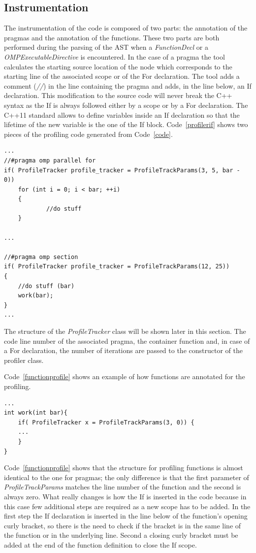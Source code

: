 \documentclass[a4paper,12pt,oneside]{book}
\begin{document}
\subsection{Instrumentation}
The instrumentation of the code is composed of two parts: the annotation of the pragmas and the annotation of the functions. These two parts are both performed during the parsing of the AST when a \emph{FunctionDecl} or a \emph{OMPExecutableDirective} is encountered. In the case of a pragma the tool calculates the starting source location of the node which corresponds to the starting line of the associated scope or of the For declaration. The tool adds a comment (\emph{//}) in the line containing the pragma and adds, in the line below,  an If declaration.  This modification to the source code will never break the C++ syntax as the If is always followed either by a scope or by a For declaration. The C++11 standard allows to define variables inside an If declaration so that the lifetime of the new variable is the one of the If block. Code~\ref{profilerif} shows two pieces of the profiling code generated from Code~\ref{code}.

\begin{lstlisting}[language=CCC, caption=Parts of the profiling code generated from Code~\ref{code}., label=profilerif]
...
//#pragma omp parallel for
if( ProfileTracker profile_tracker = ProfileTrackParams(3, 5, bar - 0))
	for (int i = 0; i < bar; ++i)
	{
    		//do stuff
	}
  
...

//#pragma omp section
if( ProfileTracker profile_tracker = ProfileTrackParams(12, 25))
{
    //do stuff (bar)
    work(bar);
}
...
\end{lstlisting}

The structure of the \emph{ProfileTracker} class will be shown later in this section. The code line number of the associated pragma, the container function and, in case of a For declaration, the number of iterations are passed to the constructor of the profiler class.

Code~\ref{functionprofile} shows an example of how functions are annotated for the profiling. 

\begin{lstlisting}[language=CCC, caption=Example of a profiled function from Code~\ref{code}., label=functionprofile ]
...
int work(int bar){
	if( ProfileTracker x = ProfileTrackParams(3, 0)) {
	...
	}
}
\end{lstlisting}

Code~\ref{functionprofile} shows that the structure for profiling functions is almost identical to the one for pragmas; the only difference is that the first parameter of \emph{ProfileTrackParams} matches the line number of the function and the second is always zero. What really changes is how the If is inserted in the code because in this case few additional steps are required as a new scope has to be added. In the first step the If declaration is inserted in the line below of the function’s opening curly bracket, so there is the need to check if the bracket is in the same line of the function or in the underlying line. Second a closing curly bracket must be added at the end of the function definition to close the If scope.
\end{document}
